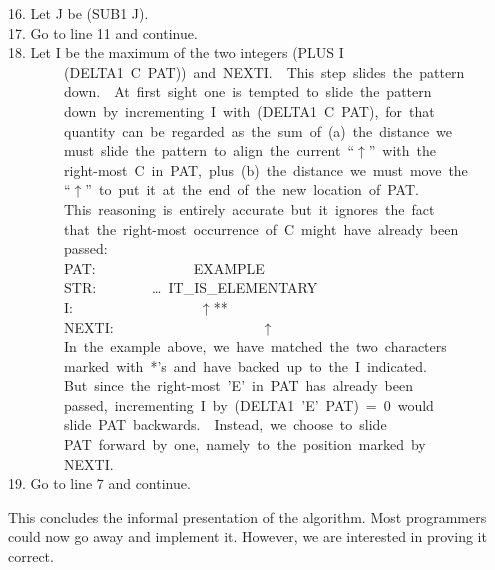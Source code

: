 \documentclass[10pt]{book}
\newenvironment{pubasis}{\begin{flushleft}}{\end{flushleft}}
\begin{document}
\begin{pubasis}
16.	   Let J be (SUB1 J).\\

17.	   Go to line 11 and continue.\\

18.   	Let I be the maximum of the two integers (PLUS I\\
~~~~~~~~(DELTA1~C~PAT))~and~NEXTI.~~This~step~slides~the~pattern\\
~~~~~~~~down.~~At~first~sight~one~is~tempted~to~slide~the~pattern\\
~~~~~~~~down~by~incrementing~I~with~(DELTA1~C~PAT),~for~that\\
~~~~~~~~quantity~can~be~regarded~as~the~sum~of~(a)~the~distance~we\\
~~~~~~~~must~slide~the~pattern~to~align~the~current~``$\uparrow$''~with~the\\
~~~~~~~~right-most~C~in~PAT,~plus~(b)~the~distance~we~must~move~the\\
~~~~~~~~``$\uparrow$''~to~put~it~at~the~end~of~the~new~location~of~PAT.\\
~~~~~~~~This~reasoning~is~entirely~accurate~but~it~ignores~the~fact\\
~~~~~~~~that~the~right-most~occurrence~of~C~might~have~already~been\\
~~~~~~~~passed:\\

~~~~~~~~PAT:~~~~~~~~~~~~~~EXAMPLE\\
~~~~~~~~STR:~~~~~~~~\ldots{}~IT\_IS\_ELEMENTARY\\
~~~~~~~~I:~~~~~~~~~~~~~~~~~~$\uparrow$**\\
~~~~~~~~NEXTI:~~~~~~~~~~~~~~~~~~~~~$\uparrow$\\

~~~~~~~~In~the~example~above,~we~have~matched~the~two~characters~\\
~~~~~~~~marked~with~*'s~and~have~backed~up~to~the~I~indicated.\\
~~~~~~~~But~since~the~right-most~'E'~in~PAT~has~already~been\\
~~~~~~~~passed,~incrementing~I~by~(DELTA1~'E'~PAT)~=~0~would\\
~~~~~~~~slide~PAT~backwards.~~Instead,~we~choose~to~slide\\
~~~~~~~~PAT~forward~by~one,~namely~to~the~position~marked~by\\
~~~~~~~~NEXTI.\\

19.	Go to line 7 and continue.\\
\end{pubasis}
This concludes the informal presentation of the algorithm.  Most programmers
could now go away and implement it.  However, we are interested in proving it
correct.
\end{document}
